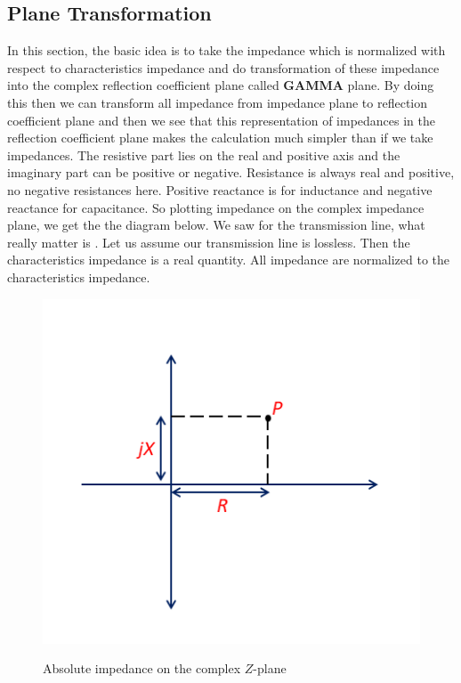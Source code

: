\subsection{Plane Transformation}
In this section, the basic idea is to take the impedance which is normalized with respect to characteristics impedance and do transformation of these impedance into the complex reflection coefficient plane called \textbf{GAMMA} plane. By doing this then we can transform all impedance from impedance plane to reflection coefficient plane and then we see that this representation of impedances in the reflection coefficient plane makes the calculation much simpler than if we take impedances. The resistive part lies on the real and positive axis and the imaginary part can be positive or negative. Resistance is always real and positive, no negative resistances here. Positive reactance is for inductance and negative reactance for capacitance. So plotting impedance on the complex impedance plane, we get the the diagram below. We saw for the transmission line, what really matter is . Let us assume our transmission line is lossless. Then the characteristics impedance is a real quantity. All impedance are normalized to the characteristics impedance.
\begin{figure}[h]
\centering
{\includegraphics[width=0.8\linewidth]{graphics/Z_plane1}}
\caption{Absolute impedance on the complex $Z$-plane}
\label{fig:mjhdj}
\end{figure}

